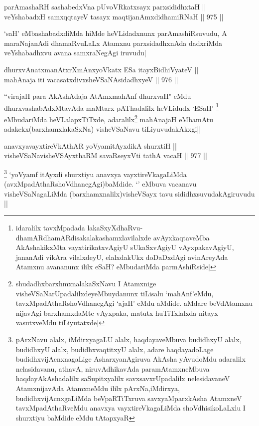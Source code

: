 
\begin{shl}
parAmashaRH sashabedxVna pUvoVRkatxsayx parxsididhxtaH || \\
veYshabadxH samxqqtayeV tasayx maqtijanAmxdidhamiRNaH ||  975 ||  
\end{shl}

\begin{artha}
`saH' eMbashabadxdiMda hiMde heVLidadxnunx parAmashiRsuvudu, A maraNajanAdi dhamaRvuLaLx Atamxnu parxsidadhxnAda dadxriMda veYshabadhxvu avana samxraNegAgi iruvudu|
\end{artha}


\begin{shl}
dhurxvAnatxmanAtxrXmAnxyoVkatx ESa itayxBidhiVyateV || \\
mahAnaja iti vacasatxdivxsheVSaNAsidadhxyeV ||  976 ||  
\end{shl}

\begin{artha}
``virajaH para AkAshAdaja AtAmxmahAnf dhurxvaH" eMdu dhurxvashabAdxMtavAda maMtarx pAThadalilx heVLidudx `ESaH' \footnote{idaralilx tavxMpadada lakaSxyXdhaRvu-dhamARdhamARdisakalakashamxlavilalxde avAyxkaqtaveMba AkAshakikxMta vayxtirikatxvAgiyU sUkaSxvAgiyU vAyxpakavAgiyU, jananAdi vikAra vilalxdeyU, elalxdakUkx doDaDxdAgi avinAreyAda Atamxnu avananunx ililx eSaH? eMbudariMda parmAshiRside|} eMbudariMda heVLalapxTiTxde, adaralilx\footnote{shudadhxbarxhmxnalakaSxNavu I Atamxnige visheVSaNarUpadalilxdeyeMbuydanunx tiLisalu `mahAnf'eMdu, tavxMpadAthaRshoVdhanegAgi `ajaH' eMdu aMdide. aMdare beVdAtamxnu nijavAgi barxhamxdaMte vAyxpaka, matutx huTiTxlalxda nitayx vasutxveMdu tiLiyutatxde|} mahAnajaH eMbamAtu adakekx(barxhamxlakaSxNa) visheVSaNavu tiLiyuvudakAkxgi||
\end{artha}


\begin{shl}
anavxyavayxtireVkAthAR yoV\s yamitAyxdikA shurxtiH || \\
visheVSaNavisheVSAyxthaRM savaRseyxVti tathA vacaH ||  977 ||  
\end{shl}

\begin{artha}
\footnote{pArxNavu alalx, iMdirxyagaLU alalx, haqdayaveMbuva budidhxyU alalx, budidhxyU alalx, budidhxvaqtitxyU alalx, adare haqdayadoLage budidhxvijAcnxnagaLige AsharxyanAgiruva AkAsha yAvudoMdu adaralilx nelasidavanu, athavA, niruvAdhikavAda paramAtamxneMbuva haqdayAkAshadalilx saSupitxyalilx savxsavxrUpadalilx nelesidavaneV AtamxnijavAda AtamxneMdu ililx pArxNa,iMdirxya, budidhxvijAcnxgaLiMda beVpaRTiTxruva savxyaMparxkAsha AtamxneV tavxMpadAthaRveMdu anavxya vayxtireVkagaLiMda shoVdhisikoLaLxlu I shurxtiyu baMdide eMdu tAtapxyaR} `yoV\s yamf  itAyxdi shurxtiyu anavxya vayxtireVkagaLiMda (avxMpadAthaRshoVdhanegAgi)baMdide. `\stext' eMbuva vacanavu visheVSaNagaLiMda (barxhamxnalilx)visheVSayx tavu sididhxsuvudakAgiruvudu ||
\end{artha}

